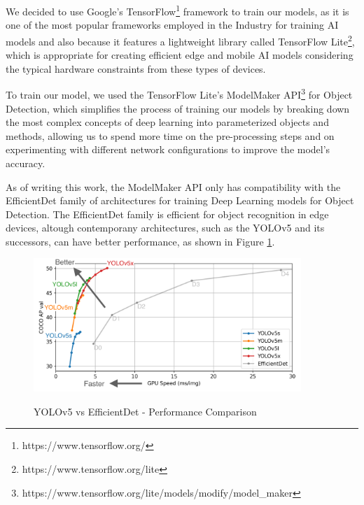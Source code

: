 We decided to use Google's TensorFlow\footnote{https://www.tensorflow.org/} framework to train our 
models, as it is one of the most popular frameworks employed in the Industry for training AI models
and also because it features a lightweight library called TensorFlow Lite\footnote{https://www.tensorflow.org/lite}, 
which is appropriate for creating efficient edge and mobile AI models considering the 
typical hardware constraints from these types of devices.

To train our model, we used the TensorFlow Lite's ModelMaker API\footnote{https://www.tensorflow.org/lite/models/modify/model\_maker} 
for Object Detection, which simplifies the process of training our models by breaking down the most
complex concepts of deep learning into parameterized objects and methods, allowing us to spend
more time on the pre-processing steps and on experimenting with different network configurations
to improve the model's accuracy. 

As of writing this work, the ModelMaker API only has compatibility
with the EfficientDet family of architectures \cite{Mingxing2020} for training
Deep Learning models for Object Detection. The EfficientDet family is efficient
for object recognition in edge devices, altough contemporany architectures,
such as the YOLOv5 and its successors, can have better performance, as shown in Figure \ref{fig:yoloefficientdet}.

\begin{figure}[H]
	\centering
	\caption[YOLOv5 vs EfficientDet - Performance Comparison]{YOLOv5 vs EfficientDet - Performance Comparison}
    \includegraphics[width=0.9\textwidth]{./images/yolo-efficientdet-comparison.png}
    \label{fig:yoloefficientdet}
\end{figure}

